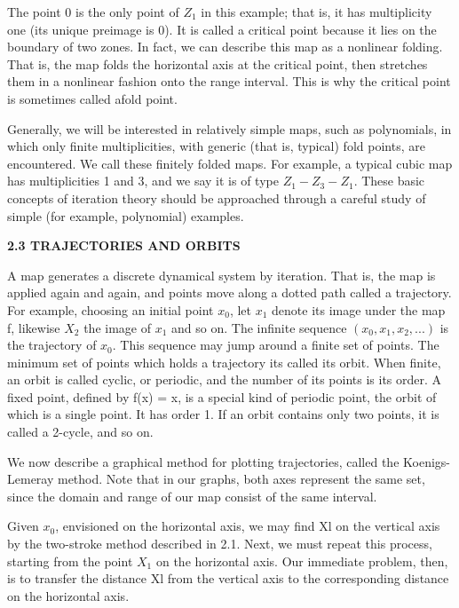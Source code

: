 \documentclass[12pt]{article}
\begin{document}
\hfill

The point 0 is the only point of $Z_1$ in this example; that is, it has
multiplicity one (its unique preimage is 0). It is called a critical
point because it lies on the boundary of two zones. In fact, we can
describe this map as a nonlinear folding. That is, the map folds the
horizontal axis at the critical point, then stretches them in a nonlinear
fashion onto the range interval. This is why the critical point is
sometimes called afold point.

\hfill

Generally, we will be interested in relatively simple maps, such
as polynomials, in which only finite multiplicities, with generic
(that is, typical) fold points, are encountered. We call these finitely
folded maps. For example, a typical cubic map has multiplicities 1
and 3, and we say it is of type $Z_1 - Z_3 - Z_1$. These basic concepts of
iteration theory should be approached through a careful study of
simple (for example, polynomial) examples.

\hfill

\textbf{2.3 TRAJECTORIES AND ORBITS}

\hfill

A map generates a discrete dynamical system by iteration. That
is, the map is applied again and again, and points move along a dotted
path called a trajectory. For example, choosing an initial point
$x_0$, let $x_1$ denote its image under the map f, likewise $X_2$ the image of $x_1$ and so on. The infinite sequence $(x_0, x_1, x_2, ...)$ is the trajectory
of $x_0$. This sequence may jump around a finite set of points. The
minimum set of points which holds a trajectory its called its orbit.
When finite, an orbit is called cyclic, or periodic, and the number of
its points is its order. A fixed point, defined by f(x) = x, is a special
kind of periodic point, the orbit of which is a single point. It has
order 1. If an orbit contains only two points, it is called a 2-cycle,
and so on.

\hfill

We now describe a graphical method for plotting trajectories,
called the Koenigs-Lemeray method. Note that in our graphs, both
axes represent the same set, since the domain and range of our map
consist of the same interval.

\hfill

Given $x_0$, envisioned on the horizontal axis, we may find Xl on
the vertical axis by the two-stroke method described in 2.1. Next,
we must repeat this process, starting from the point $X_1$ on the horizontal
axis. Our immediate problem, then, is to transfer the distance
Xl from the vertical axis to the corresponding distance on the horizontal
axis.
\end{document}
